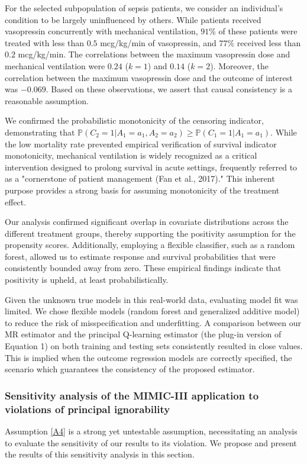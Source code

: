 \documentclass{article}
\newcommand{\pr}{\mathbb{P}}
\newcommand{\tred}{{}}   %
\begin{document}
For the selected subpopulation of sepsis patients, we consider an individual's condition to be largely uninfluenced by others. While patients received vasopressin concurrently with mechanical ventilation, $91$\% of these patients were treated with less than $0.5$ mcg/kg/min of vasopressin, and $77$\% received less than $0.2$ mcg/kg/min. The correlations between the maximum vasopressin dose and mechanical ventilation were $0.24$ ($k=1$) and $0.14$ ($k=2$). Moreover, the correlation between the maximum vasopressin dose and the outcome of interest was $-0.069$. Based on these observations, we assert that causal consistency is a reasonable assumption.

We confirmed the probabilistic monotonicity of the censoring indicator, demonstrating that $\pr(C_2=1|A_1=a_1,A_2=a_2) \ge \pr(C_1=1|A_1=a_1)$. While the low mortality rate prevented empirical verification of survival indicator monotonicity, mechanical ventilation is widely recognized as a critical intervention designed to prolong survival in acute settings, frequently referred to as a "cornerstone of patient management (Fan et al., 2017)." This inherent purpose provides a strong basis for assuming monotonicity of the treatment effect.

Our analysis confirmed significant overlap in covariate distributions across the different treatment groups, thereby supporting the positivity assumption for the propensity scores. Additionally, employing a flexible classifier, such as a random forest, allowed us to estimate response and survival probabilities that were consistently bounded away from zero. These empirical findings indicate that positivity is upheld, at least probabilistically.

Given the unknown true models in this real-world data, evaluating model fit was limited. We chose flexible models (random forest and generalized additive model) to reduce the risk of misspecification and underfitting. A comparison between our MR estimator and the principal Q-learning estimator (the plug-in version of Equation 1) on both training and testing sets consistently resulted in close values. This is implied when the outcome regression models are correctly specified, the scenario which guarantees the consistency of the proposed estimator.



%
\tred{
\subsubsection{Sensitivity analysis of the MIMIC-III application to violations of principal ignorability}
}
Assumption \ref{A4} is a strong yet untestable assumption, necessitating an analysis to evaluate the sensitivity of our results to its violation. We propose and present the results of this sensitivity analysis in this section.
\end{document}

